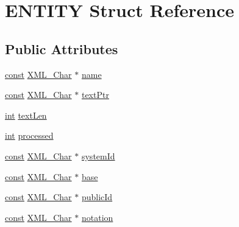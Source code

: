 \hypertarget{struct_e_n_t_i_t_y}{}\section{E\+N\+T\+I\+TY Struct Reference}
\label{struct_e_n_t_i_t_y}
\subsection*{Public Attributes}
\begin{DoxyCompactItemize}
\item 
\hyperlink{getopt1_8c_a2c212835823e3c54a8ab6d95c652660e}{const} \hyperlink{amiga_2include_2libraries_2expat_8h_a63da96463e775e1ec3a7d1f076208127}{X\+M\+L\+\_\+\+Char} $\ast$ \hyperlink{struct_e_n_t_i_t_y_a98131be27a5e764186275b66151cd6af}{name}
\item 
\hyperlink{getopt1_8c_a2c212835823e3c54a8ab6d95c652660e}{const} \hyperlink{amiga_2include_2libraries_2expat_8h_a63da96463e775e1ec3a7d1f076208127}{X\+M\+L\+\_\+\+Char} $\ast$ \hyperlink{struct_e_n_t_i_t_y_a70490f298908d8db563aea7aac7bcfb5}{text\+Ptr}
\item 
\hyperlink{xmltok_8h_a5a0d4a5641ce434f1d23533f2b2e6653}{int} \hyperlink{struct_e_n_t_i_t_y_ac57e7c56dbcf23ae36045f2825820c02}{text\+Len}
\item 
\hyperlink{xmltok_8h_a5a0d4a5641ce434f1d23533f2b2e6653}{int} \hyperlink{struct_e_n_t_i_t_y_a5652817ed5b28294c66eb7f04ac9fc9d}{processed}
\item 
\hyperlink{getopt1_8c_a2c212835823e3c54a8ab6d95c652660e}{const} \hyperlink{amiga_2include_2libraries_2expat_8h_a63da96463e775e1ec3a7d1f076208127}{X\+M\+L\+\_\+\+Char} $\ast$ \hyperlink{struct_e_n_t_i_t_y_a8b74ccc447469b367cfbea8fffe51077}{system\+Id}
\item 
\hyperlink{getopt1_8c_a2c212835823e3c54a8ab6d95c652660e}{const} \hyperlink{amiga_2include_2libraries_2expat_8h_a63da96463e775e1ec3a7d1f076208127}{X\+M\+L\+\_\+\+Char} $\ast$ \hyperlink{struct_e_n_t_i_t_y_a36d7f70aa77c870be4a1e1c6f2ba62a3}{base}
\item 
\hyperlink{getopt1_8c_a2c212835823e3c54a8ab6d95c652660e}{const} \hyperlink{amiga_2include_2libraries_2expat_8h_a63da96463e775e1ec3a7d1f076208127}{X\+M\+L\+\_\+\+Char} $\ast$ \hyperlink{struct_e_n_t_i_t_y_a5790026218864599e3611846122f443f}{public\+Id}
\item 
\hyperlink{getopt1_8c_a2c212835823e3c54a8ab6d95c652660e}{const} \hyperlink{amiga_2include_2libraries_2expat_8h_a63da96463e775e1ec3a7d1f076208127}{X\+M\+L\+\_\+\+Char} $\ast$ \hyperlink{struct_e_n_t_i_t_y_af99aeccdfa361acd6c15537875083eaf}{notation}

\end{DoxyCompactItemize}
